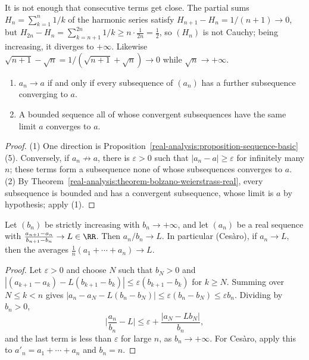 \begin{counterexample}\label{real-analysis:counterexample-consecutive-differences}
It is not enough that consecutive terms get close. The partial sums $H_n = \sum_{k=1}^n1/k$ of the harmonic series satisfy $H_{n+1} - H_n = 1/(n + 1) \to 0$, but
$H_{2n} - H_n = \sum_{k=n+1}^{2n}1/k \geq n \cdot \frac{1}{2n} = \frac12$, so $(H_n)$ is not Cauchy; being increasing, it diverges to $+\infty$. Likewise $\sqrt{n + 1} - \sqrt n = 1/(\sqrt{n + 1} + \sqrt n) \to 0$
while $\sqrt n \to +\infty$.
\end{counterexample}

\begin{proposition}\label{real-analysis:proposition-subsequence-criterion}
\begin{enumerate}
\item $a_n \to a$ if and only if every subsequence of $(a_n)$ has a further subsequence converging to $a$.
\item A bounded sequence all of whose convergent subsequences have the same limit $a$ converges to $a$.
\end{enumerate}
\end{proposition}

\begin{proof}
(1) One direction is Proposition~\ref{real-analysis:proposition-sequence-basic}(5). Conversely, if $a_n \not\to a$, there is $\varepsilon > 0$ such that $|a_n - a| \geq \varepsilon$ for infinitely many $n$; these terms form a
subsequence none of whose subsequences converges to $a$. (2) By Theorem~\ref{real-analysis:theorem-bolzano-weierstrass-real}, every subsequence is bounded and has a convergent subsequence, whose limit is $a$ by
hypothesis; apply (1).
\end{proof}

\begin{proposition}\label{real-analysis:proposition-stolz-cesaro}
Let $(b_n)$ be strictly increasing with $b_n \to +\infty$, and let $(a_n)$ be a real sequence with $\frac{a_{n+1} - a_n}{b_{n+1} - b_n} \to L \in \RR$. Then $a_n/b_n \to L$. In particular (Ces\`aro), if $a_n \to L$, then
the averages $\frac{1}{n}(a_1 + \cdots + a_n) \to L$.
\end{proposition}

\begin{proof}
Let $\varepsilon > 0$ and choose $N$ such that $b_N > 0$ and $|(a_{k+1} - a_k) - L(b_{k+1} - b_k)| \leq \varepsilon(b_{k+1} - b_k)$ for $k \geq N$. Summing over $N \leq k < n$ gives
$|a_n - a_N - L(b_n - b_N)| \leq \varepsilon(b_n - b_N) \leq \varepsilon b_n$. Dividing by $b_n > 0$,
\[
\Big|\frac{a_n}{b_n} - L\Big| \leq \varepsilon + \frac{|a_N - Lb_N|}{b_n},
\]
and the last term is less than $\varepsilon$ for large $n$, as $b_n \to +\infty$. For Ces\`aro, apply this to $a'_n = a_1 + \cdots + a_n$ and $b_n = n$.
\end{proof}

